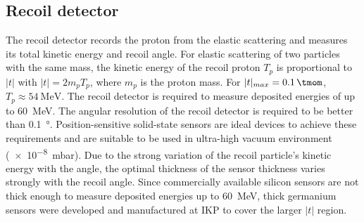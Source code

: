 \documentclass[number,5p]{elsarticle}
\begin{document}
\subsection{Recoil detector}
\label{sec:recoil}

The recoil detector records the proton from the
elastic scattering and measures its total kinetic energy and recoil angle.
For elastic scattering of two particles with the same mass,
the kinetic energy of the recoil proton \(T_p\) is proportional to $|t|$ with \(|t| = 2m_pT_p\), where \(m_p\) is the proton mass.
For $|t|_{max}=\SI{0.1}{\tmom}$, \(T_p \approx \SI{54}{\MeV}\).
The recoil detector is required to measure deposited energies of up to \SI{60}{\MeV}.
The angular resolution of the recoil detector is required to be better than \SI{0.1}{\degree}.
Position-sensitive solid-state sensors are ideal devices to achieve these
requirements and are suitable to be used in ultra-high vacuum environment (\SI{e-8}{\milli\bar}).
Due to the strong variation of the recoil particle's kinetic energy with the angle,
the optimal thickness of the sensor thickness varies strongly with the recoil angle.
Since commercially available silicon sensors are not thick enough to measure deposited energies up to \SI{60}{\MeV},
thick germanium sensors were developed and manufactured at IKP to cover the larger $|t|$ region.
\end{document}
